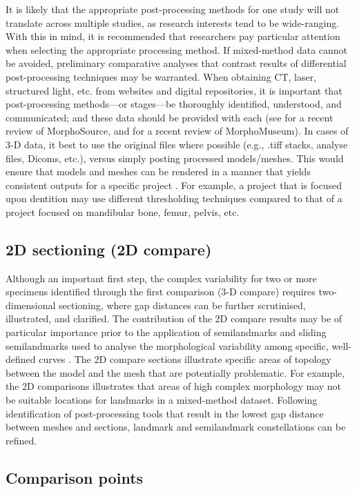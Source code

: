 \documentclass[review]{elsarticle}
\begin{document}
It is likely that the appropriate post-processing methods for one study will not translate across multiple studies, as research interests tend to be wide-ranging. With this in mind, it is recommended that researchers pay particular attention when selecting the appropriate processing method. If mixed-method data cannot be avoided, preliminary comparative analyses that contrast results of differential post-processing techniques may be warranted. When obtaining CT, laser, structured light, etc. from websites and digital repositories, it is important that post-processing methods---or stages---be thoroughly identified, understood, and communicated; and these data should be provided with each (see \cite{RN11502} for a recent review of MorphoSource, and \cite{RN11503} for a recent review of MorphoMuseum). In cases of 3-D data, it best to use the original files where possible (e.g., .tiff stacks, analyse files, Dicoms, etc.), versus simply posting processed models/meshes. This would ensure that models and meshes can be rendered in a manner that yields consistent outputs for a specific project \citep{RN8984}. For example, a project that is focused upon dentition may use different thresholding techniques compared to that of a project focused on mandibular bone, femur, pelvis, etc.

\subsection{2D sectioning (2D compare)}

Although an important first step, the complex variability for two or more specimens identified through the first comparison (3-D compare) requires two-dimensional sectioning, where gap distances can be further scrutinised, illustrated, and clarified. The contribution of the 2D compare results may be of particular importance prior to the application of semilandmarks \citep{RN4772,RN1768} and sliding semilandmarks used to analyse the morphological variability among specific, well-defined curves \citep{RN5921,RN5920}. The 2D compare sections illustrate specific areas of topology between the model and the mesh that are potentially problematic. For example, the 2D comparisons illustrates that areas of high complex morphology may not be suitable locations for landmarks in a mixed-method dataset. Following identification of post-processing tools that result in the lowest gap distance between meshes and sections, landmark and semilandmark constellations can be refined.

\subsection{Comparison points}
\end{document}
